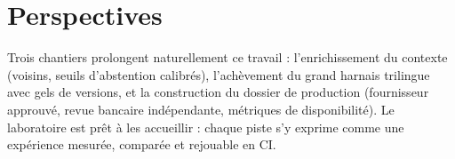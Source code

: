 \documentclass[a4paper,12pt]{report}
\begin{document}
\section*{Perspectives}
Trois chantiers prolongent naturellement ce travail : l'enrichissement du contexte (voisins, seuils d'abstention calibr\'es), l'ach\`evement du grand harnais trilingue avec gels de versions, et la construction du dossier de production (fournisseur approuv\'e, revue bancaire ind\'ependante, m\'etriques de disponibilit\'e). Le laboratoire est pr\^et \`a les accueillir : chaque piste s'y exprime comme une exp\'erience mesur\'ee, compar\'ee et rejouable en CI.
\end{document}
